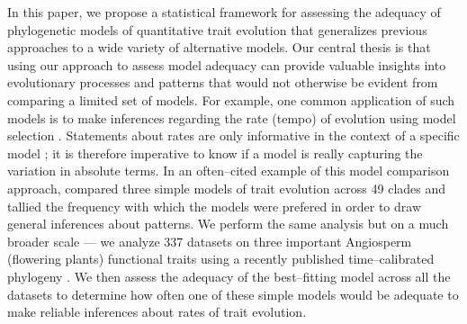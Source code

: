 \documentclass[a4paper,11pt]{article}
\begin{document}
In this paper, we propose a statistical framework for assessing the adequacy of phylogenetic models of quantitative trait evolution that generalizes previous approaches to a wide variety of alternative models. Our central thesis is that using our approach to assess model adequacy can provide valuable insights into evolutionary processes and patterns that would not otherwise be evident from comparing a limited set of models. For example, one common application of such models is to make inferences regarding the rate (tempo) of evolution using model selection \citep[e.g.,][]{Mooers1999, Harmon2010, Hunt2012, SlaterMEE}. Statements about rates are only informative in the context of a specific model \citep{Hunt2012}; it is therefore imperative to know if a model is really capturing the variation in absolute terms. In an often--cited example of this model comparison approach, \citet{Harmon2010} compared three simple models of trait evolution across 49 clades and tallied the frequency with which the models were prefered in order to draw general inferences about patterns. We perform the same analysis but on a much broader scale --- we analyze 337 datasets on three important Angiosperm (flowering plants) functional traits using a recently published time--calibrated phylogeny \citep{Zanne2013}. We then assess the adequacy of the best--fitting model across all the datasets to determine how often one of these simple models would be adequate to make reliable inferences about rates of trait evolution.
 
\end{document}
